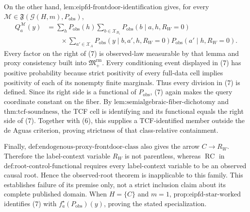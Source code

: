 On the other hand, \(\text{lem:eipfd-frontdoor-identification}\) gives, for every \(\mathcal M\in\mathfrak F(\mathcal G(H,m),P_{\mathrm{obs}})\),
\[
\begin{aligned}
Q_a^{\mathcal M}(y)
&=\sum_hP_{\mathrm{obs}}(h)
  \sum_{b\in\mathcal X_{B_1}}P_{\mathrm{obs}}(b\mid a,h,R_W=0)\\
&\qquad\times
  \sum_{a'\in\mathcal X_A}
  P_{\mathrm{obs}}(y\mid b,a',h,R_W=0)
  P_{\mathrm{obs}}(a'\mid h,R_W=0).
\end{aligned}
\tag{7}
\]
Every factor on the right of (7) is observed-law measurable by that lemma and proxy consistency built into \(\mathfrak M_{+}^{\mathrm{rm}}\). Every conditioning event displayed in (7) has positive probability because strict positivity of every full-data cell implies positivity of each of its nonempty finite marginals. Thus every division in (7) is defined. Since its right side is a functional of \(P_{\mathrm{obs}}\), (7) again makes the query coordinate constant on the fiber. By \(\text{lem:semialgebraic-fiber-dichotomy}\) and \(\text{thm:tcf-soundness}\), the TCF cell is identifying and its functional equals the right side of (7). Together with (6), this supplies a TCF-identified member outside the de Aguas criterion, proving strictness of that class-relative containment.

Finally, \(\text{def:endogenous-proxy-frontdoor-class}\) also gives the arrow \(C\to R_W\). Therefore the label-context variable \(R_W\) is not parentless, whereas \(\operatorname{RC}\) in \(\text{def:root-control-functional}\) requires every label-context variable to be an observed causal root. Hence the observed-root theorem is inapplicable to this family. This establishes failure of its premise only, not a strict inclusion claim about its complete published domain. When \(H=\{C\}\) and \(m=1\), \(\text{prop:eipfd-star-worked}\) identifies (7) with \(f_a^\star(P_{\mathrm{obs}})(y)\), proving the stated specialization.